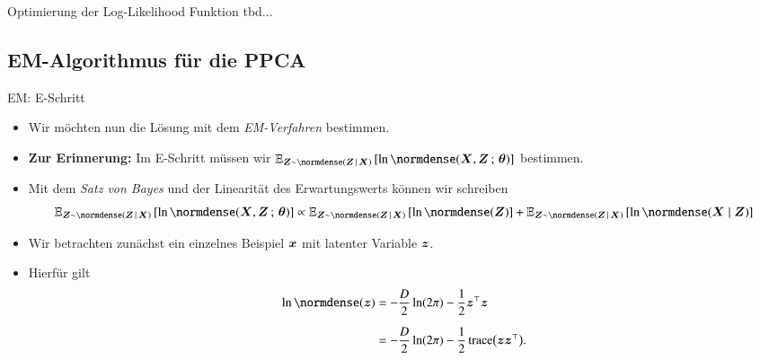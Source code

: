 \begin{frame}{Optimierung der Log-Likelihood Funktion}{}
	tbd...
\end{frame}


\subsection{EM-Algorithmus für die PPCA}

\begin{frame}{EM: E-Schritt}{}
	\begin{itemize}
		\item Wir möchten nun die Lösung mit dem \textit{EM-Verfahren} bestimmen.
		\item \textbf{Zur Erinnerung:} Im E-Schritt müssen wir
			$\E_{\bZ \sim \normdense(\bZ\,\mid\,\bX)}\left[ \ln \normdense(\bX, \bZ \param \btheta) \right]$ bestimmen.
		\item Mit dem \textit{Satz von Bayes} und der Linearität des Erwartungswerts können wir schreiben
		\begin{equation} \label{eq:ppca-em-expectations-general}
			\E_{\bZ \sim \normdense(\bZ\,\mid\,\bX)}\left[ \ln \normdense(\bX, \bZ \param \btheta) \right]
				\propto \E_{\bZ \sim \normdense(\bZ\,\mid\,\bX)}\left[ \ln \normdense(\bZ) \right]
					+ \E_{\bZ \sim \normdense(\bZ\,\mid\,\bX)}\left[ \ln \normdense(\bX \mid \bZ) \right]
		\end{equation}
		\item Wir betrachten zunächst ein einzelnes Beispiel $\bm{x}$ mit latenter Variable $\bm{z}$.
		\item Hierfür gilt
		\begin{equation}
			\begin{aligned}
				\ln \normdense(\bz)
					&= -\frac{D}{2} \ln(2 \pi) - \frac{1}{2} \bz^\top \bz
			\\[2mm]
					&= -\frac{D}{2} \ln(2 \pi) - \frac{1}{2} \trace\bigl( \bz \bz^\top \bigr).
			\end{aligned}
		\end{equation}
	\end{itemize}
\end{frame}


